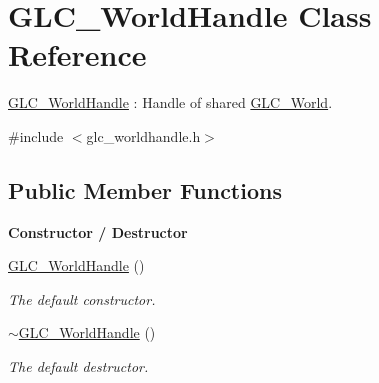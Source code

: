 \hypertarget{class_g_l_c___world_handle}{\section{G\-L\-C\-\_\-\-World\-Handle Class Reference}
\label{class_g_l_c___world_handle}
}


\hyperlink{class_g_l_c___world_handle}{G\-L\-C\-\_\-\-World\-Handle} \-: Handle of shared \hyperlink{class_g_l_c___world}{G\-L\-C\-\_\-\-World}.  




{\ttfamily \#include $<$glc\-\_\-worldhandle.\-h$>$}

\subsection*{Public Member Functions}
\begin{Indent}{\bf Constructor / Destructor}\par
\begin{DoxyCompactItemize}
\item 
\hyperlink{class_g_l_c___world_handle_a279e95725e759fa7ca42e5be6f0075e5}{G\-L\-C\-\_\-\-World\-Handle} ()
\begin{DoxyCompactList}\small\item\em The default constructor. \end{DoxyCompactList}\item 
\hyperlink{class_g_l_c___world_handle_a1683ac93460792e187a32bd04fa0d2f7}{$\sim$\-G\-L\-C\-\_\-\-World\-Handle} ()
\begin{DoxyCompactList}\small\item\em The default destructor. \end{DoxyCompactList}\end{DoxyCompactItemize}
\end{Indent}
